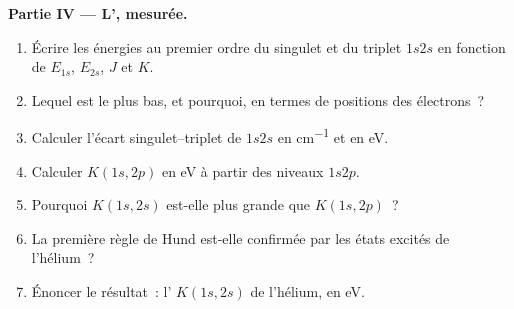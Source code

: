 \begin{problem}
\medskip\noindent\textbf{Partie IV --- L', mesurée.}
\begin{enumerate}[resume]
  \item Écrire les énergies au premier ordre du singulet et du triplet
        $1s2s$ en fonction de $E_{1s}$, $E_{2s}$, $J$ et $K$.
  \item Lequel est le plus bas, et pourquoi, en termes de positions des
        électrons~?
  \item Calculer l'écart singulet--triplet de $1s2s$ en \unit{cm^{-1}} et
        en eV.
  \item Calculer $K(1s,2p)$ en eV à partir des niveaux $1s2p$.
  \item Pourquoi $K(1s,2s)$ est-elle plus grande que $K(1s,2p)$~?
  \item La première règle de Hund est-elle confirmée par les états
        excités de l'hélium~?
  \item Énoncer le résultat~: l' $K(1s,2s)$ de
        l'hélium, en eV.
\end{enumerate}
\end{problem}
